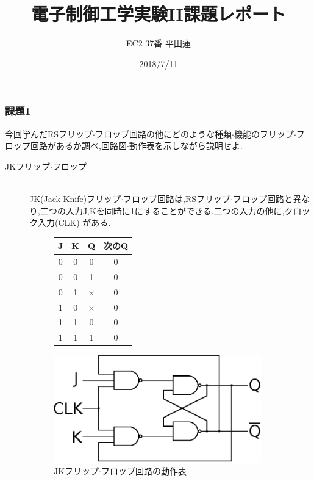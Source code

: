 \documentclass[uplatex]{jsarticle}
\title{電子制御工学実験II課題レポート}
\author{EC2 37番 平田蓮}
\date{2018/7/11}
\makeatletter
\newcommand{\tblcaption}[1]{\def\@captype{table}\caption{#1}}
\makeatother
\begin{document}
    \maketitle
    \subsubsection*{課題1}
        今回学んだRSフリップ$\cdot$フロップ回路の他にどのような種類$\cdot$機能のフリップ$\cdot$フロップ回路があるか調べ,回路図$\cdot$動作表を示しながら説明せよ.
        \begin{description}
            \item[JKフリップ$\cdot$フロップ]\mbox{}\\
                JK(Jack Knife)フリップ$\cdot$フロップ回路は,RSフリップ$\cdot$フロップ回路と異なり,二つの入力J,Kを同時に1にすることができる.二つの入力の他に,クロック入力(CLK)
                がある.
                \begin{figure}[h]
                    \def\@captype{table}
                    \begin{minipage}{.4\textwidth}
                        \begin{center}
                            \begin{tabular}{c|c|c|c}\hline
                                J & K & Q        & 次のQ \\ \hline
                                0 & 0 & 0        & 0 \\ \hline
                                0 & 0 & 1        & 0 \\ \hline
                                0 & 1 & $\times$ & 0 \\ \hline
                                1 & 0 & $\times$ & 0 \\ \hline
                                1 & 1 & 0        & 0 \\ \hline
                                1 & 1 & 1        & 0 \\ \hline
                            \end{tabular}
                        \end{center}
                        \tblcaption{JKフリップ$\cdot$フロップ回路の動作表}
                    \end{minipage}
                    \hfill
                    \begin{minipage}[c]{.6\textwidth}
                        \includegraphics[width = 9.0cm]{JK.eps}

\end{minipage}
\end{figure}
\end{description}
\end{document}
